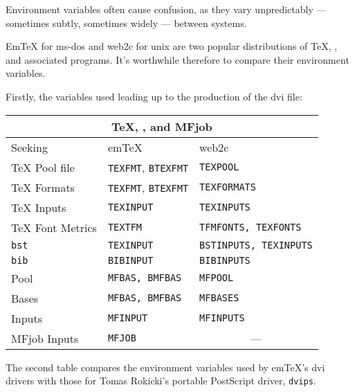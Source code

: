 Environment variables often cause confusion, as they vary unpredictably
--- sometimes subtly, sometimes widely --- between systems.

Em\TeX{} for {\sc ms-dos} and {\sf web2c} for {\sc unix} are two
popular distributions of \TeX{}, \MF{}, and associated programs.
It's worthwhile therefore to compare their environment variables.

Firstly, the variables used leading up to the production of the
{\sc dvi} file:

\begin{center}
\begin{tabular}{|l|l|l|}
  \hline
  \multicolumn{3}{|c|}{\TeX{}, \BibTeX{}, \MF{} and {\sf MFjob}} \\
  \hline
  Seeking & em\TeX{} & {\sf web2c} \\
  \hline
  \TeX{} Pool file & {\tt TEXFMT}, {\tt BTEXFMT} & {\tt TEXPOOL} \\
  \TeX{} Formats & {\tt TEXFMT}, {\tt BTEXFMT} & {\tt TEXFORMATS} \\
  \TeX{} Inputs & {\tt TEXINPUT} & {\tt TEXINPUTS} \\
  \TeX{} Font Metrics & {\tt TEXTFM} & {\tt TFMFONTS, TEXFONTS} \\
  \hline
  \BibTeX{} {\tt bst} & {\tt TEXINPUT} & {\tt BSTINPUTS, TEXINPUTS} \\
  \BibTeX{} {\tt bib} & {\tt BIBINPUT} & {\tt BIBINPUTS} \\
  \hline
  \MF{} Pool & {\tt MFBAS, BMFBAS} & {\tt MFPOOL} \\
  \MF{} Bases & {\tt MFBAS, BMFBAS} & {\tt MFBASES} \\
  \MF{} Inputs & {\tt MFINPUT} & {\tt MFINPUTS} \\
  {\sf MFjob} Inputs & {\tt MFJOB} & \multicolumn{1}{c|}{---} \\
  \hline
\end{tabular}
\end{center}

The second table compares the environment variables used by em\TeX{}'s
{\sc dvi} drivers with those for Tomas {\sc Rokicki\/}'s portable
{\sf PostScript} driver, {\tt dvips}.

